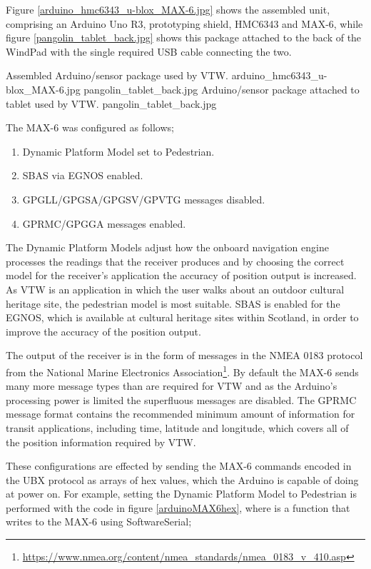 Figure \ref{arduino_hmc6343_u-blox_MAX-6.jpg} shows the assembled unit, comprising an Arduino Uno R3, prototyping shield, HMC6343 and MAX-6, while figure \ref{pangolin_tablet_back.jpg} shows this package attached to the back of the WindPad with the single required USB cable connecting the two.

 {Assembled Arduino/sensor package used by VTW.} {arduino_hmc6343_u-blox_MAX-6.jpg}
       {pangolin_tablet_back.jpg} {Arduino/sensor package attached to tablet used by VTW.} {pangolin_tablet_back.jpg}
       

The MAX-6 was configured as follows;

\begin{enumerate}
	\item Dynamic Platform Model set to Pedestrian.
	\item SBAS via EGNOS enabled.
	\item GPGLL/GPGSA/GPGSV/GPVTG messages disabled.
	\item GPRMC/GPGGA messages enabled.
\end{enumerate}

The Dynamic Platform Models adjust how the onboard navigation engine processes the readings that the receiver produces and by choosing the correct model for the receiver's application the accuracy of position output is increased. As VTW is an application in which the user walks about an outdoor cultural heritage site, the pedestrian model is most suitable. SBAS is enabled for the EGNOS, which is available at cultural heritage sites within Scotland, in order to improve the accuracy of the position output.

The output of the receiver is in the form of messages in the NMEA 0183 protocol from the National Marine Electronics Association\footnote{\url{https://www.nmea.org/content/nmea_standards/nmea_0183_v_410.asp}}. By default the MAX-6 sends many more message types than are required for VTW and as the Arduino's processing power is limited the superfluous messages are disabled. The GPRMC message format contains the recommended minimum amount of information for transit applications, including time, latitude and longitude, which covers all of the position information required by VTW.

These configurations are effected by sending the MAX-6 commands encoded in the UBX protocol as arrays of hex values, which the Arduino is capable of doing at power on. For example, setting the Dynamic Platform Model to Pedestrian is performed with the code in figure \ref{arduinoMAX6hex}, where  is a function that writes to the MAX-6 using SoftwareSerial;

